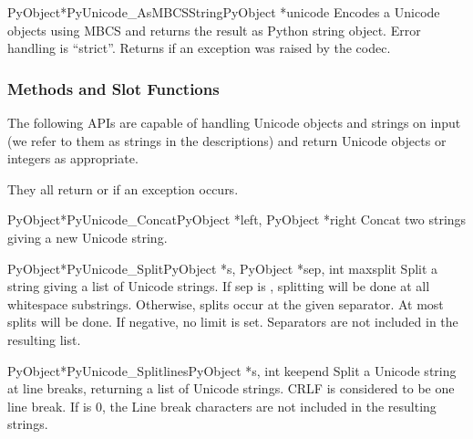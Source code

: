 \begin{cfuncdesc}{PyObject*}{PyUnicode_AsMBCSString}{PyObject *unicode}
  Encodes a Unicode objects using MBCS and returns the result as
  Python string object.  Error handling is ``strict''.  Returns
  \NULL{} if an exception was raised by the codec.
\end{cfuncdesc}


\subsubsection{Methods and Slot Functions \label{unicodeMethodsAndSlots}}

The following APIs are capable of handling Unicode objects and strings
on input (we refer to them as strings in the descriptions) and return
Unicode objects or integers as appropriate.

They all return \NULL{} or  if an exception occurs.

\begin{cfuncdesc}{PyObject*}{PyUnicode_Concat}{PyObject *left,
                                               PyObject *right}
  Concat two strings giving a new Unicode string.
\end{cfuncdesc}

\begin{cfuncdesc}{PyObject*}{PyUnicode_Split}{PyObject *s,
                                              PyObject *sep,
                                              int maxsplit}
  Split a string giving a list of Unicode strings.  If sep is \NULL{},
  splitting will be done at all whitespace substrings.  Otherwise,
  splits occur at the given separator.  At most  splits
  will be done.  If negative, no limit is set.  Separators are not
  included in the resulting list.
\end{cfuncdesc}

\begin{cfuncdesc}{PyObject*}{PyUnicode_Splitlines}{PyObject *s,
                                                   int keepend}
  Split a Unicode string at line breaks, returning a list of Unicode
  strings.  CRLF is considered to be one line break.  If 
  is 0, the Line break characters are not included in the resulting
  strings.
\end{cfuncdesc}

